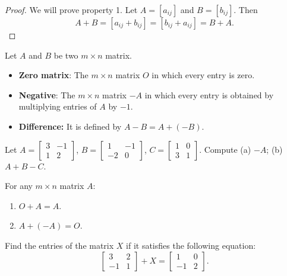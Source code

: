 \documentclass[20pt,a4paper]{extarticle}
\newcounter{example}[section]
\newcounter{theorem}
\newcounter{definition}[section]
\begin{document}
\begin{proof}
We will prove property 1. Let $A = [a_{ij}]$ and $B = [b_{ij}]$. Then
	\[
		A + B = [a_{ij} + b_{ij}] = [b_{ij} + a_{ij}] = B + A . \tag*{$\square$}
	\]
\end{proof}

\vspace*{-24pt}
\begin{definition}
Let $A$ and $B$ be two $m \times n$ matrix.
\begin{itemize}
	\item \textbf{Zero matrix}: The $m \times n$ matrix $O$ in which every entry is zero.
	\item \textbf{Negative}: The $m \times n$ matrix $-A$ in which every entry is obtained by multiplying entries of $A$ by $-1$.
	\item \textbf{Difference:} It is defined by $A - B = A + (-B)$.
\end{itemize}
\end{definition}

\begin{example}
Let $A = \begin{bmatrix} 3 & -1 \\ 1 & 2 \end{bmatrix}$, $B = \begin{bmatrix} 1 & -1 \\ -2 & 0 \end{bmatrix}$, $C = \begin{bmatrix} 1 & 0 \\ 3 & 1 \end{bmatrix}$. Compute (a) $-A$; (b) $A + B - C$.
\end{example}

\begin{solution}

\end{solution}

\newpage 

\vspace*{4cm}

\begin{theorem}
For any $m \times n$ matrix $A$:
	\begin{enumerate}
		\item $O + A = A$.
		\item $A + (-A) = O$. 
	\end{enumerate}
\end{theorem}

\begin{example}
Find the entries of the matrix $X$ if it satisfies the following equation:
	$$ 
	\begin{bmatrix} 3 & 2 \\ -1 & 1 \end{bmatrix} + X = \begin{bmatrix} 1 & 0 \\ -1 & 2 \end{bmatrix}.
	$$
\end{example}
\end{document}
